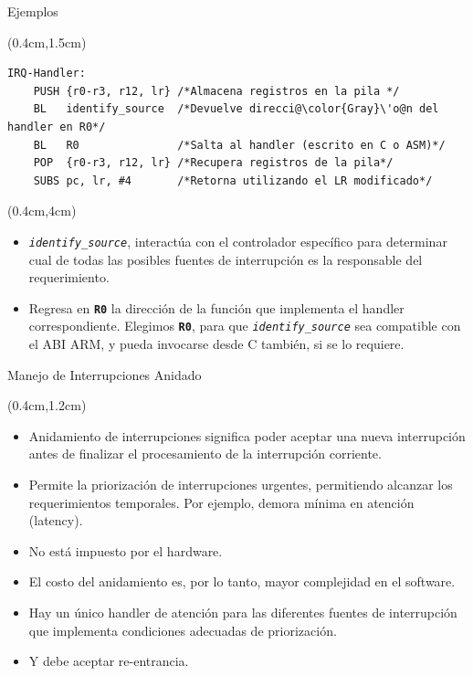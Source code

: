 \documentclass[usenames,table,xcolor={x11names},aspectratio=169]{beamer}
\begin{document}
\begin{frame}[t,fragile]{Ejemplos}
 \begin{textblock*}{\textwidth}(0.4cm,1.5cm) \justifying
   \begin{lstlisting}[basicstyle=\scriptsize,escapechar=\@,numbers=none, frame=single, xleftmargin=20pt, xrightmargin=0pt,]
IRQ-Handler:
    PUSH {r0-r3, r12, lr} /*Almacena registros en la pila */
    BL   identify_source  /*Devuelve direcci@\color{Gray}\'o@n del handler en R0*/
    BL   R0               /*Salta al handler (escrito en C o ASM)*/
    POP  {r0-r3, r12, lr} /*Recupera registros de la pila*/
    SUBS pc, lr, #4       /*Retorna utilizando el LR modificado*/
   \end{lstlisting}
 \end{textblock*}
 \begin{textblock*}{\textwidth}(0.4cm,4cm) 
  \begin{itemize}[<+(1)->]\justifying \parskip 0.2cm
   \item \textit{\texttt{identify\_source}}, interactúa con el controlador específico para determinar cual de todas las posibles fuentes de interrupción es la responsable del requerimiento.
   \item Regresa en \texttt{\textbf{R0}} la dirección de la función que implementa el handler correspondiente. Elegimos \texttt{\textbf{R0}}, para que \textit{\texttt{identify\_source}} sea compatible con el ABI ARM, y pueda invocarse desde C también, si se lo requiere.
  \end{itemize}
 \end{textblock*}
\end{frame}

\begin{frame}[t]{Manejo de Interrupciones Anidado}
 \begin{textblock*}{\textwidth}(0.4cm,1.2cm) 
  \begin{itemize}[<+(1)->]\justifying
   \item Anidamiento de interrupciones significa poder aceptar una nueva interrupción antes de finalizar el procesamiento de la interrupción corriente.
   \item Permite la priorización de interrupciones urgentes, permitiendo alcanzar los requerimientos temporales. Por ejemplo, demora mínima en atención (latency). 
   \item No está impuesto por el hardware.
   \item El costo del anidamiento es, por lo tanto,  mayor complejidad en el software.
   \item Hay un único handler de atención para las diferentes fuentes de interrupción que implementa condiciones adecuadas de priorización.
   \item Y debe aceptar re-entrancia.
  \end{itemize}
 \end{textblock*}
\end{frame}
   
\end{document}
